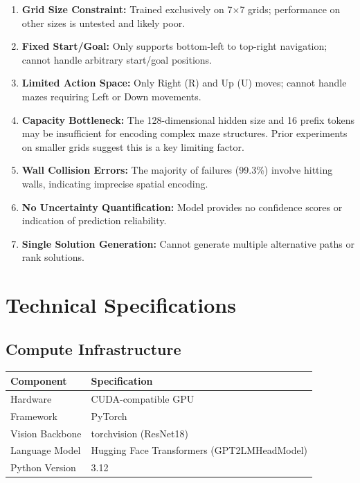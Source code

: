 \documentclass[11pt,a4paper]{article}
\begin{document}
\begin{warningbox}
\begin{enumerate}[noitemsep]
    \item \textbf{Grid Size Constraint:} Trained exclusively on 7$\times$7 grids; performance on other sizes is untested and likely poor.
    
    \item \textbf{Fixed Start/Goal:} Only supports bottom-left to top-right navigation; cannot handle arbitrary start/goal positions.
    
    \item \textbf{Limited Action Space:} Only Right (R) and Up (U) moves; cannot handle mazes requiring Left or Down movements.
    
    \item \textbf{Capacity Bottleneck:} The 128-dimensional hidden size and 16 prefix tokens may be insufficient for encoding complex maze structures. Prior experiments on smaller grids suggest this is a key limiting factor.
    
    \item \textbf{Wall Collision Errors:} The majority of failures (99.3\%) involve hitting walls, indicating imprecise spatial encoding.
    
    \item \textbf{No Uncertainty Quantification:} Model provides no confidence scores or indication of prediction reliability.
    
    \item \textbf{Single Solution Generation:} Cannot generate multiple alternative paths or rank solutions.
\end{enumerate}
\end{warningbox}

\section{Technical Specifications}

\subsection{Compute Infrastructure}

\begin{center}
\begin{tabular}{ll}
\toprule
\textbf{Component} & \textbf{Specification} \\
\midrule
Hardware & CUDA-compatible GPU \\
Framework & PyTorch \\
Vision Backbone & torchvision (ResNet18) \\
Language Model & Hugging Face Transformers (GPT2LMHeadModel) \\
Python Version & 3.12 \\
\bottomrule
\end{tabular}
\end{center}
\end{document}
